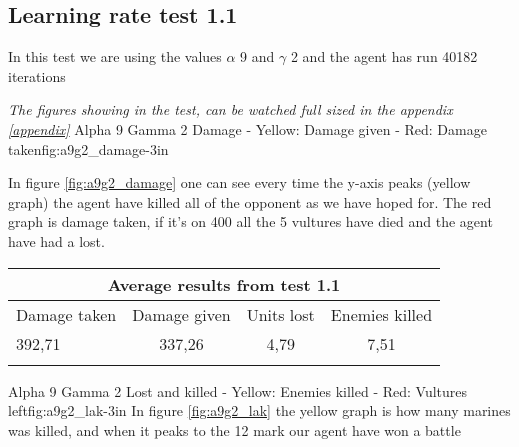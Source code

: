 
\subsection*{Learning rate test 1.1}
In this test we are using the values $\alpha$ 9 and $\gamma$ 2 and the agent has run 40182 iterations


\textit{The figures showing in the test, can be watched full sized in the appendix \ref{appendix}} 
			{Alpha 9 Gamma 2 Damage - Yellow: Damage given - Red: Damage taken}{fig:a9g2_damage}{-3in}

In figure \ref{fig:a9g2_damage} one can see every time the y-axis peaks (yellow graph) the agent have killed all of the opponent as we have hoped for. The red graph is damage taken, if it's on 400 all the 5 vultures have died and the agent have had a lost.

\begin{centering}
 \begin{tabular}{|l||c|c|c|}
	\multicolumn{4}{c}{Average results from test 1.1} \\
	\hline
		Damage taken & Damage given & Units lost & Enemies killed\\
	\hline
		392,71 & 337,26 & 4,79 & 7,51 \\
	\hline
\label{test1.1}
\end{tabular}
\end{centering}






			{Alpha 9 Gamma 2 Lost and killed - Yellow: Enemies killed - Red: Vultures left}{fig:a9g2_lak}{-3in}
In figure \ref{fig:a9g2_lak} the yellow graph is how many marines was killed, and when it peaks to the 12 mark our agent have won a battle

